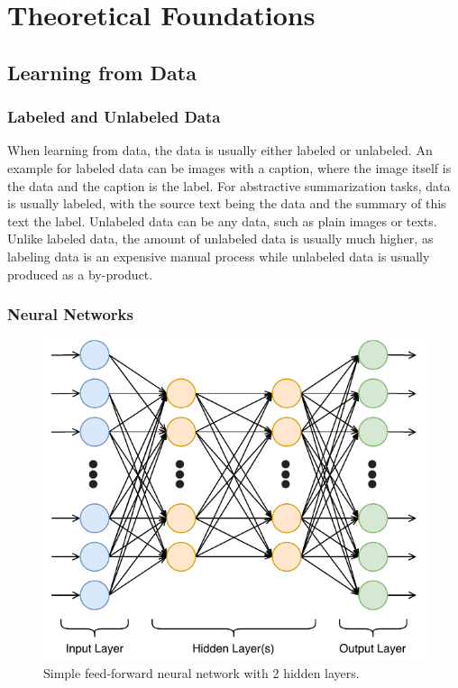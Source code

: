 \chapter{Theoretical Foundations}\label{ch:theoretical-foundations}


\section{Learning from Data}

\subsection{Labeled and Unlabeled Data}

When learning from data, the data is usually either labeled or unlabeled.
An example for labeled data can be images with a caption, where the image itself is the data and the caption is the label.
For abstractive summarization tasks, data is usually labeled, with the source text being the data and the summary of this text the label.
Unlabeled data can be any data, such as plain images or texts.
Unlike labeled data, the amount of unlabeled data is usually much higher, as labeling data is an expensive manual process while unlabeled data is usually produced as a by-product.


\subsection{Neural Networks}

\begin{figure}[h]
\centering
\includegraphics[width=0.45\paperwidth]{figures/neural-network}
\caption{Simple feed-forward neural network with 2 hidden layers.}
\label{fig:neural-network}
\end{figure}


